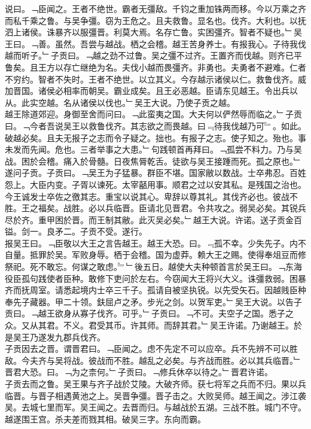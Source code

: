 \documentclass{zhvt-classic}
\begin{document}
\hspace*{2em}说曰。﹁臣闻之。王者不绝世。霸者无彊敌。千钧之重加铢两而移。今以万乘之齐而私千乘之鲁。与吴争彊。窃为王危之。且夫救鲁。显名也。伐齐。大利也。以抚泗上诸侯。诛暴齐以服彊晋。利莫大焉。名存亡鲁。实困彊齐。智者不疑也。﹂吴王曰。﹁善。虽然。吾尝与越战。栖之会稽。越王苦身养士。有报我心。子待我伐越而听子。﹂子贡曰。﹁越之劲不过鲁。吴之彊不过齐。王置齐而伐越。则齐已平鲁矣。且王方以存亡继绝为名。夫伐小越而畏彊齐。非勇也。夫勇者不避难。仁者不穷约。智者不失时。王者不绝世。以立其义。今存越示诸侯以仁。救鲁伐齐。威加晋国。诸侯必相率而朝吴。霸业成矣。且王必恶越。臣请东见越王。令出兵以从。此实空越。名从诸侯以伐也。﹂吴王大说。乃使子贡之越。\\
\hspace*{2em}越王除道郊迎。身御至舍而问曰。﹁此蛮夷之国。大夫何以俨然辱而临之。﹂子贡曰。﹁今者吾说吴王以救鲁伐齐。其志欲之而畏越。曰﹃待我伐越乃可﹄。如此。破越必矣。且夫无报子之志而令子疑之。拙也。有报子之志。使子知之。殆也。事未发而先闻。危也。三者举事之大患。﹂句践顿首再拜曰。﹁孤尝不料力。乃与吴战。困於会稽。痛入於骨髓。日夜焦脣乾舌。徒欲与吴王接踵而死。孤之原也。﹂遂问子贡。子贡曰。﹁吴王为子猛暴。群臣不堪。国家敝以数战。士卒弗忍。百姓怨上。大臣内变。子胥以谏死。太宰嚭用事。顺君之过以安其私。是残国之治也。今王诚发士卒佐之徼其志。重宝以说其心。卑辞以尊其礼。其伐齐必也。彼战不胜。王之福矣。战胜。必以兵临晋。臣请北见晋君。令共攻之。弱吴必矣。其锐兵尽於齐。重甲困於晋。而王制其敝。此灭吴必矣。﹂越王大说。许诺。送子贡金百镒。剑一。良矛二。子贡不受。遂行。\\
\hspace*{2em}报吴王曰。﹁臣敬以大王之言告越王。越王大恐。曰。﹃孤不幸。少失先子。内不自量。抵罪於吴。军败身辱。栖于会稽。国为虚莽。赖大王之赐。使得奉俎豆而修祭祀。死不敢忘。何谋之敢虑。﹄﹂後五日。越使大夫种顿首言於吴王曰。﹁东海役臣孤句践使者臣种。敢修下吏问於左右。今窃闻大王将兴大义。诛彊救弱。困暴齐而抚周室。请悉起境内士卒三千子。孤请自被坚执锐。以先受矢石。因越贱臣种奉先子藏器。甲二十领。鈇屈卢之矛。步光之剑。以贺军吏。﹂吴王大说。以告子贡曰。﹁越王欲身从寡子伐齐。可乎。﹂子贡曰。﹁不可。夫空子之国。悉子之众。又从其君。不义。君受其币。许其师。而辞其君。﹂吴王许诺。乃谢越王。於是吴王乃遂发九郡兵伐齐。\\
\hspace*{2em}子贡因去之晋。谓晋君曰。﹁臣闻之。虑不先定不可以应卒。兵不先辨不可以胜敌。今夫齐与吴将战。彼战而不胜。越乱之必矣。与齐战而胜。必以其兵临晋。﹂晋君大恐。曰。﹁为之柰何。﹂子贡曰。﹁修兵休卒以待之。﹂晋君许诺。\\
\hspace*{2em}子贡去而之鲁。吴王果与齐子战於艾陵。大破齐师。获七将军之兵而不归。果以兵临晋。与晋子相遇黄池之上。吴晋争彊。晋子击之。大败吴师。越王闻之。涉江袭吴。去城七里而军。吴王闻之。去晋而归。与越战於五湖。三战不胜。城门不守。越遂围王宫。杀夫差而戮其相。破吴三字。东向而霸。\\
\end{document}
